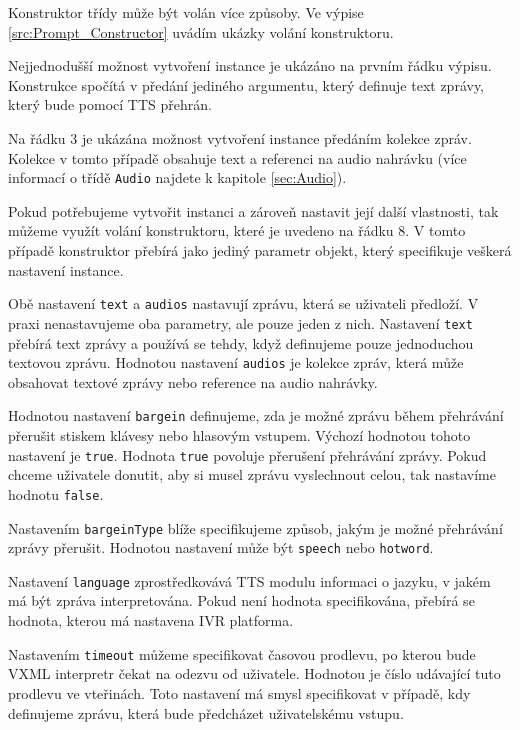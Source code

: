 \documentclass[ing,male,java,dept460,twoside]{diploma}						%
\begin{document}
Konstruktor třídy může být volán více způsoby. Ve výpise \ref{src:Prompt_Constructor} uvádím ukázky volání konstruktoru.



Nejjednodušší možnost vytvoření instance je ukázáno na prvním řádku výpisu. Konstrukce spočítá v předání jediného argumentu, který definuje text zprávy, který bude pomocí TTS přehrán.

Na řádku 3 je ukázána možnost vytvoření instance předáním kolekce zpráv. Kolekce v tomto případě obsahuje text a referenci na audio nahrávku (více informací o třídě \texttt{Audio} najdete k kapitole \ref{sec:Audio}).

Pokud potřebujeme vytvořit instanci a zároveň nastavit její další vlastnosti, tak můžeme využít volání konstruktoru, které je uvedeno na řádku 8. V tomto případě konstruktor přebírá jako jediný parametr objekt, který specifikuje veškerá nastavení instance.

Obě nastavení \texttt{text} a \texttt{audios} nastavují zprávu, která se uživateli předloží. V praxi nenastavujeme oba parametry, ale pouze jeden z nich. Nastavení \texttt{text} přebírá text zprávy a používá se tehdy, když definujeme pouze jednoduchou textovou zprávu. Hodnotou nastavení \texttt{audios} je kolekce zpráv, která může obsahovat textové zprávy nebo reference na audio nahrávky.

Hodnotou nastavení \texttt{bargein} definujeme, zda je možné zprávu během přehrávání přerušit stiskem klávesy nebo hlasovým vstupem. Výchozí hodnotou tohoto nastavení je \texttt{true}. Hodnota \texttt{true} povoluje přerušení přehrávání zprávy. Pokud chceme uživatele donutit, aby si musel zprávu vyslechnout celou, tak nastavíme hodnotu \texttt{false}.

Nastavením \texttt{bargeinType} blíže specifikujeme způsob, jakým je možné přehrávání zprávy přerušit. Hodnotou nastavení může být \texttt{speech} nebo \texttt{hotword}.

Nastavení \texttt{language} zprostředkovává TTS modulu informaci o jazyku, v jakém má být zpráva interpretována. Pokud není hodnota specifikována, přebírá se hodnota, kterou má nastavena IVR platforma.

Nastavením \texttt{timeout} můžeme specifikovat časovou prodlevu, po kterou bude VXML interpretr čekat na odezvu od uživatele. Hodnotou je číslo udávající tuto prodlevu ve vteřinách. Toto nastavení má smysl specifikovat v případě, kdy definujeme zprávu, která bude předcházet uživatelskému vstupu.
\end{document}

